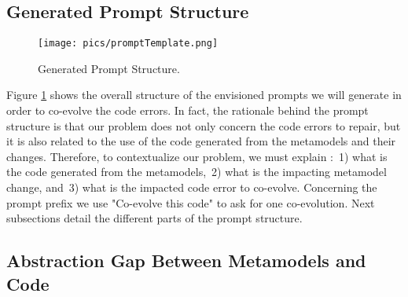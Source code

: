 \subsection{Generated Prompt Structure}

\begin{figure}[t]
\centering
\texttt{[image: pics/promptTemplate.png]}
\caption{Generated Prompt Structure.}
\label{fig:promptstructure}
\vspace{-5mm}
\end{figure}

Figure \ref{fig:promptstructure} shows the overall structure of the envisioned prompts we will generate in order to co-evolve the code errors. In fact, the rationale behind the prompt structure is that our problem does not only concern the code errors to repair, but it is also related to the use of the code generated from the metamodels and their changes. Therefore, to contextualize our problem, we must explain :~1) what is the code generated from the metamodels,~2) what is the impacting metamodel change, and~3) what is the impacted code error to co-evolve.  Concerning the prompt prefix we use "Co-evolve this code" to ask \LLM for one co-evolution. Next subsections detail the different parts of the prompt structure. 

\subsection{Abstraction Gap Between Metamodels and Code}

